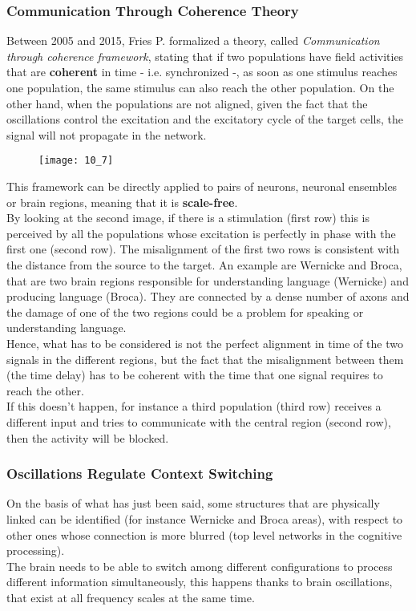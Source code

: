 \subsubsection{Communication Through Coherence Theory}
Between 2005 and 2015, Fries P. formalized a theory, called \textit{Communication through
coherence framework}, stating that if two populations have field activities that are
\textbf{coherent} in time - i.e. synchronized -, as soon as one stimulus reaches one population,
the same stimulus can also reach the other population. On the other hand, when the populations
are not aligned, given the fact that the oscillations control the excitation and the
excitatory cycle of the target cells, the signal will not propagate in the network.
\begin{figure}[H]
    \texttt{[image: 10\_7]}
    \centering
\end{figure}
This framework can be directly applied to pairs of neurons, neuronal ensembles or brain
regions, meaning that it is \textbf{scale-free}.\\
By looking at the second image, if there is a stimulation (first row) this is perceived by
all the populations whose excitation is perfectly in phase with the first one (second row).
The misalignment of the first two rows is consistent with the distance from the source to the
target. An example are Wernicke and Broca, that are two brain regions responsible for
understanding language (Wernicke) and producing language (Broca). They are connected by a
dense number of axons and the damage of one of the two regions could be a problem for
speaking or understanding language.\\
Hence, what has to be considered is not the perfect alignment in time of the two signals in
the different regions, but the fact that the misalignment between them (the time delay) has
to be coherent with the time that one signal requires to reach the other.\\
If this doesn't happen, for instance a third population (third row) receives a different
input and tries to communicate with the central region (second row), then the activity will
be blocked.
\subsubsection{Oscillations Regulate Context Switching}
On the basis of what has just been said, some structures that are physically linked can be
identified (for instance Wernicke and Broca areas), with respect to other ones whose
connection is more blurred (top level networks in the cognitive processing).\\
The brain needs to be able to switch among different configurations to process different
information simultaneously, this happens thanks to brain oscillations, that exist at all
frequency scales at the same time.
